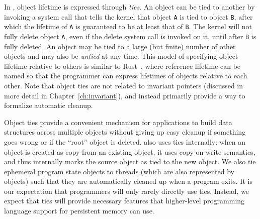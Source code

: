 In \Twizzler, object lifetime is expressed through \emph{ties}.
An object can be tied to another by invoking a system call that tells the kernel that
object \texttt{A} is tied to object \texttt{B}, after which the lifetime of \texttt{A} is
guaranteed to be at least that of \texttt{B}. The kernel will not fully delete object \texttt{A}, even if the
delete system call is invoked on it, until after \texttt{B} is fully deleted. An object may be tied
to a large (but finite) number of other objects and may also be \emph{untied} at any time. This
model of specifying object lifetime relative to others is similar to Rust~\cite{rust}, where
reference lifetime can be named so that the programmer can express lifetimes of objects relative to
each other. Note that object ties are not related to invariant pointers (discussed in more detail
in Chapter~\ref{ch:invariant}), and instead primarily provide a way to formalize automatic cleanup.


Object ties provide a convenient mechanism for applications to build data structures across
multiple objects without giving up easy cleanup if something goes wrong or if the ``root'' object is
deleted. \Twizzler also uses ties internally: when an object is created as copy-from an existing
object, it uses copy-on-write semantics, and thus internally marks the source object as tied to the
new object. We also tie ephemeral program state objects to threads (which are also represented by
objects) such that they are automatically cleaned up when a program exits. It is our expectation
that programmers will only rarely directly use ties. Instead, we expect that ties will
provide necessary features that higher-level programming language support for persistent memory can
use.

